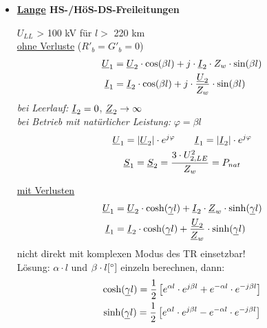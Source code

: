 \begin{itemize}
\item[] \textbf{\ul{Lange} HS-/HöS-DS-Freileitungen}

    $U_{LL}$ > 100 kV für $l>$ 220 km\\

    \ul{ohne Verluste} ($R'_b = G'_b = 0$)
    \begin{align*}
        \underline{U}_1 &= \underline{U}_2 \cdot \cos(\beta l) + j \cdot \underline{I}_2 \cdot Z_w \cdot \sin (\beta l)\\
        \underline{I}_1 &= \underline{I}_2 \cdot \cos(\beta l) + j \cdot \frac{\underline{U}_2}{Z_w} \cdot \sin (\beta l)
    \end{align*}
    \textit{bei Leerlauf:} $\underline{I}_2 = 0$, $\underline{Z}_2 \rightarrow \infty$\\
    \textit{bei Betrieb mit natürlicher Leistung:} $\varphi = \beta l$
    \begin{gather*}
        \underline{U}_1 = |\underline{U}_2| \cdot e^{j\varphi} \qquad
        \underline{I}_1 = |\underline{I}_2| \cdot e^{j\varphi}\\
        \underline{S}_1 = \underline{S}_2 = \frac{3 \cdot U_{2,LE}^2}{Z_w} = P_{nat}
    \end{gather*}

    \ul{mit Verlusten}
    \begin{align*}
        \underline{U}_1 &= \underline{U}_2 \cdot \cosh(\underline{\gamma} l) + \underline{I}_2 \cdot \underline{Z}_w \cdot \sinh(\underline{\gamma} l)\\
        \underline{I}_1 &= \underline{I}_2 \cdot \cosh(\underline{\gamma} l) + \frac{\underline{U}_2}{\underline{Z}_w}\cdot \sinh(\underline{\gamma} l)
    \end{align*}
    nicht direkt mit komplexen Modus des TR einsetzbar!\\
    Lösung: $\alpha \cdot l $ und $ \beta \cdot l [\degree]$ einzeln berechnen, dann:
    \begin{gather*}
        \cosh(\underline{\gamma}l) = \frac{1}{2} \left[e^{\alpha l} \cdot e^{j\beta l} + e^{-\alpha l} \cdot e^{-j\beta l} \right]\\
        \sinh (\underline{\gamma}l)= \frac{1}{2} \left[e^{\alpha l} \cdot e^{j\beta l} - e^{-\alpha l} \cdot e^{-j\beta l} \right]\\
    \end{gather*}


\end{itemize}
